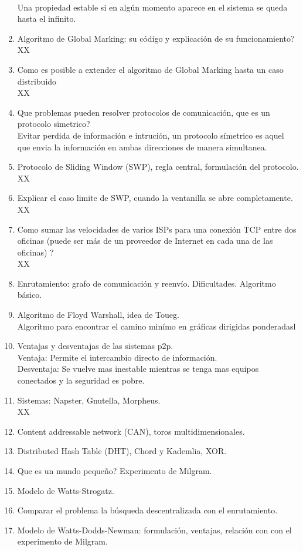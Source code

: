 \documentclass[letterpaper, 12pt]{article}
\begin{document}
\begin{enumerate}
		\\ Una propiedad estable si en algún momento aparece en el sistema se queda hasta el infinito.
		\item Algoritmo de Global Marking: su código y explicación de su funcionamiento?
		\\XX
		\item Como es posible a extender el algoritmo de Global Marking hasta un caso distribuido
		\\XX
		\item Que problemas pueden resolver protocolos de comunicación, que es un protocolo simetrico?
		\\ Evitar perdida de información e intrución, un protocolo símetrico es aquel que envia la información en ambas direcciones de manera simultanea.
		\item Protocolo de Sliding Window (SWP), regla central, formulación del protocolo.
		\\XX
		\item Explicar el caso limite de SWP, cuando la ventanilla se abre completamente.
		\\XX
		\item Como sumar las velocidades de varios ISPs para una conexión TCP entre dos oficinas (puede ser más de un proveedor de Internet en cada una de las oficinas) ?
		\\XX		
		\item Enrutamiento: grafo de comunicación y reenvío. Dificultades. Algoritmo básico.
		\item Algoritmo de Floyd Warshall, idea de Toueg.
		\\ Algoritmo para encontrar el camino minímo en gráficas dirigidas ponderadasl
		\item Ventajas y desventajas de las sistemas p2p.
		\\Ventaja: Permite el intercambio directo de información.
		\\Desventaja: Se vuelve mas inestable mientras se tenga mas equipos conectados y la seguridad es pobre. 
		\item Sistemas: Napster, Gnutella, Morpheus.
		\\XX
		\item Content addressable network (CAN), toros multidimensionales.
		\item Distributed Hash Table (DHT), Chord y Kademlia, XOR.
		\item Que es un mundo pequeño? Experimento de Milgram.
		\item Modelo de Watts-Strogatz.
		\item Comparar el problema la búsqueda descentralizada con el enrutamiento.
		\item Modelo de Watts-Dodds-Newman: formulación, ventajas, relación con con el experimento de Milgram.
		
	\end{enumerate}
\end{document}
